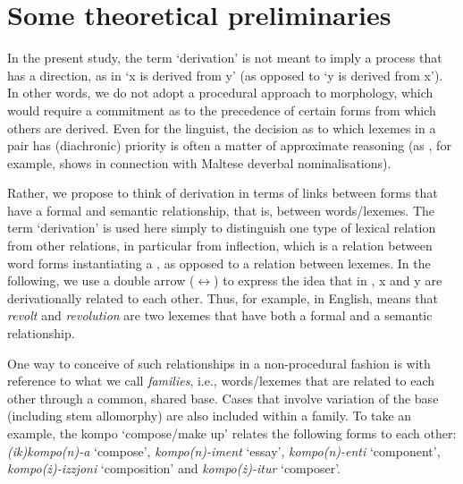 \documentclass[output=paper]{LSP/langsci}
\begin{document}
\section{Some theoretical preliminaries}\label{sec:preliminaries}
In the present study, the term `derivation' is not meant to imply a process that has a direction, as in `{\sc x} is derived from {\sc y}' (as opposed to `{\sc y} is derived from {\sc x}'). In other words, we do not adopt a procedural approach to  morphology, which would require a commitment as to the precedence of certain forms from which others are derived.  Even for the linguist, the decision as to which lexemes in a pair has (diachronic) priority is often a matter of approximate reasoning (as \citealt{Ellul2016}, for example, shows in connection with Maltese deverbal nominalisations).

Rather, we propose to think of derivation in terms of links between forms that have a formal and semantic relationship, that is, between words/lexemes. The term `derivation' is used here simply to distinguish one type of lexical relation from other relations, in particular from inflection, which is a relation between  word forms instantiating a , as opposed to a relation between lexemes. In the following, we use a double arrow ($\leftrightarrow$) to express the idea that in , {\sc x} and {\sc y} are derivationally related to each other. Thus, for example, in English,  means that \textit{revolt} and \textit{revolution} are two lexemes that have both a formal and a semantic relationship.

One way to conceive of such  relationships in a non-procedural fashion is with reference to what we call \textit{ families}, i.e., words/lexemes that are related to each other through a common, shared base. Cases that involve  variation of the base (including stem allomorphy) are also included within a  family. To take an example, the  {\sc kompo} `compose/make up' relates the following forms to each other: \textit{(ik)kompo(n)-a} `compose', \textit{kompo(n)-iment} `essay', \textit{kompo(n)-enti} `component', \textit{kompo(ż)-izzjoni} `composition' and \textit{kompo(ż)-itur} `composer'.

%
 
\end{document}
